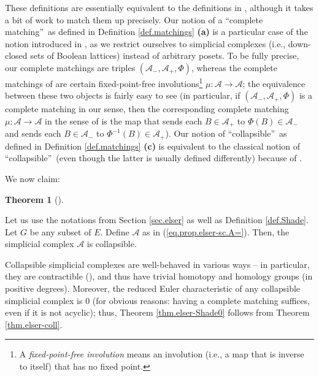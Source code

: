 \documentclass[numbers=enddot,12pt,final,onecolumn]{scrartcl}%
\theoremstyle{definition}
\newtheorem{theo}{Theorem}[section]
\newenvironment{theorem}[1][]
{\begin{theo}[#1]\begin{leftbar}}
{\end{leftbar}\end{theo}}
\begin{document}
These definitions are essentially equivalent to the definitions in
\cite{Kozlov20}, although it takes a bit of work to match them up precisely.
Our notion of a \textquotedblleft complete matching\textquotedblright\ as
defined in Definition \ref{def.matchings} \textbf{(a)} is a particular case of
the notion introduced in \cite[Chapter 10]{Kozlov20}, as we restrict ourselves
to simplicial complexes (i.e., down-closed sets of Boolean lattices) instead
of arbitrary posets. To be fully precise, our complete matchings are triples
$\left(  \mathcal{A}_{-},\mathcal{A}_{+},\Phi\right)  $, whereas the complete
matchings of \cite[Chapter 10]{Kozlov20} are certain fixed-point-free
involutions\footnote{A \emph{fixed-point-free involution} means an involution
(i.e., a map that is inverse to itself) that has no fixed point.}
$\mu:\mathcal{A}\rightarrow\mathcal{A}$; the equivalence between these two
objects is fairly easy to see (in particular, if $\left(  \mathcal{A}%
_{-},\mathcal{A}_{+},\Phi\right)  $ is a complete matching in our sense, then
the corresponding complete matching $\mu:\mathcal{A}\rightarrow\mathcal{A}$ in
the sense of \cite[Chapter 10]{Kozlov20} is the map that sends each
$B\in\mathcal{A}_{+}$ to $\Phi\left(  B\right)  \in\mathcal{A}_{-}$ and sends
each $B\in\mathcal{A}_{-}$ to $\Phi^{-1}\left(  B\right)  \in\mathcal{A}_{+}%
$). Our notion of \textquotedblleft collapsible\textquotedblright\ as defined
in Definition \ref{def.matchings} \textbf{(c)} is equivalent to the classical
notion of \textquotedblleft collapsible\textquotedblright\ (even though the
latter is usually defined differently) because of \cite[Theorem 10.9]%
{Kozlov20}.

We now claim:

\begin{theorem}
\label{thm.elser-coll}Let us use the notations from Section \ref{sec.elser} as
well as Definition \ref{def.Shade}. Let $G$ be any subset of $E$. Define
$\mathcal{A}$ as in (\ref{eq.prop.elser-sc.A=}). Then, the simplicial complex
$\mathcal{A}$ is collapsible.
\end{theorem}

Collapsible simplicial complexes are well-behaved in various ways -- in
particular, they are contractible (\cite[Corollary 9.19]{Kozlov20}), and thus
have trivial homotopy and homology groups (in positive degrees). Moreover, the
reduced Euler characteristic of any collapsible simplicial complex is $0$ (for
obvious reasons: having a complete matching suffices, even if it is not
acyclic); thus, Theorem \ref{thm.elser-Shade0} follows from Theorem
\ref{thm.elser-coll}.
\end{document}
